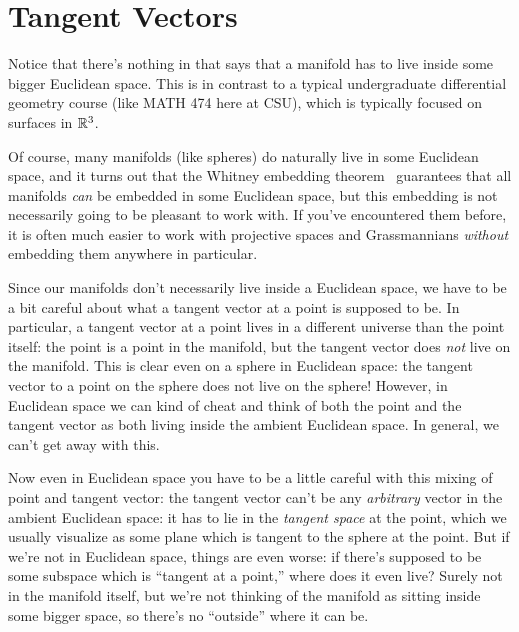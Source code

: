 
\section{Tangent Vectors}

Notice that there's nothing in  that says that a manifold has to live inside some bigger Euclidean space. This is in contrast to a typical undergraduate differential geometry course (like MATH 474 here at CSU), which is typically focused on surfaces in $\mathbb{R}^3$. 

Of course, many manifolds (like spheres) do naturally live in some Euclidean space, and it turns out that the Whitney embedding theorem~\cite{whitneySelfintersectionsSmoothnmanifold1944,whitneySingularitiesSmoothnmanifold1944} guarantees that all manifolds \emph{can} be embedded in some Euclidean space, but this embedding is not necessarily going to be pleasant to work with. If you've encountered them before, it is often much easier to work with projective spaces and Grassmannians \emph{without} embedding them anywhere in particular.

Since our manifolds don't necessarily live inside a Euclidean space, we have to be a bit careful about what a tangent vector at a point is supposed to be. In particular, a tangent vector at a point lives in a different universe than the point itself: the point is a point in the manifold, but the tangent vector does \emph{not} live on the manifold. This is clear even on a sphere in Euclidean space: the tangent vector to a point on the sphere does not live on the sphere! However, in Euclidean space we can kind of cheat and think of both the point and the tangent vector as both living inside the ambient Euclidean space. In general, we can't get away with this.

Now even in Euclidean space you have to be a little careful with this mixing of point and tangent vector: the tangent vector can't be any \emph{arbitrary} vector in the ambient Euclidean space: it has to lie in the \emph{tangent space} at the point, which we usually visualize as some plane which is tangent to the sphere at the point. But if we're not in Euclidean space, things are even worse: if there's supposed to be some subspace which is ``tangent at a point,'' where does it even live? Surely not in the manifold itself, but we're not thinking of the manifold as sitting inside some bigger space, so there's no ``outside'' where it can be.

